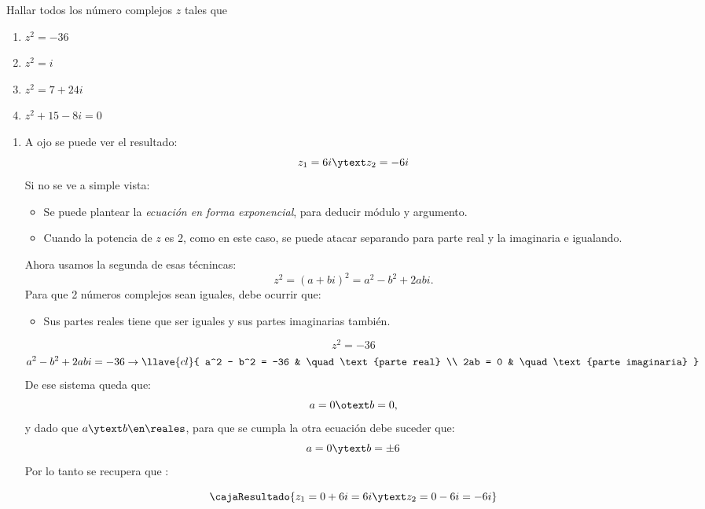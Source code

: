 \begin{enunciado}{\ejercicio}
  Hallar todos los número complejos $z$ tales que
  \begin{multicols}{4}
    \begin{enumerate}[label=\roman*)]
      \item $z^2 = -36$
      \item $z^2 = i$
      \item $z^2 = 7+24i$
      \item $z^2 + 15 -8i = 0$
    \end{enumerate}
  \end{multicols}
\end{enunciado}

\begin{enumerate}[label=\roman*)]
  \item\label{ej-3-item-i} A ojo se puede ver el resultado:
        $$
          z_1 = 6i \ytext z_2 = -6i
        $$
        Si no se ve a simple vista:
        \begin{itemize}
          \item Se puede plantear la \textit{ecuación en forma exponencial}, para deducir módulo y argumento.
          \item Cuando la potencia de $z$ es 2, como en este caso, se puede atacar separando para parte real y la imaginaria e igualando.
        \end{itemize}
        Ahora usamos la segunda de esas técnincas:
        $$
          z^2 = (a+bi)^2 = a^2-b^2 + 2abi.
        $$
        Para que 2 números complejos sean iguales, debe ocurrir que:
        \begin{itemize}[label=\tiny{}]
          \item Sus partes reales tiene que ser iguales y sus partes imaginarias también.
        \end{itemize}
        $$
          z^2 = -36
        $$
        $$
          a^2-b^2 + 2abi = - 36
          \to
          \llave{cl}{
            a^2 - b^2 = -36 & \quad \text{parte real}       \\
            2ab = 0         & \quad \text{parte imaginaria}
          }
        $$
        De ese sistema queda que:
        $$
          a = 0 \otext b = 0,
        $$
        y dado que $a\ytext b \en \reales$, para que se cumpla la otra ecuación debe suceder que:
        $$
          a = 0 \ytext b = \pm6
        $$
        Por lo tanto se recupera que :

        $$
          \cajaResultado{
            z_1 = 0 + 6i = 6i
            \ytext
            z_2 = 0 - 6i = - 6i
          }
        $$


\end{enumerate}
